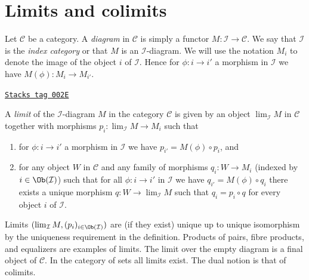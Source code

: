 \section{Limits and colimits}
\label{categories-section-limits}
Let $\mathcal{C}$ be a category. A {\it diagram} in $\mathcal{C}$ is
simply a functor $M : \mathcal{I} \to \mathcal{C}$. We say that
$\mathcal{I}$ is the {\it index category} or that $M$ is an
$\mathcal{I}$-diagram. We will use the notation $M_i$ to denote the
image of the object
$i$ of $\mathcal{I}$. Hence for $\phi : i \to i'$ a morphism
in $\mathcal{I}$ we have $M(\phi) : M_i \to M_{i'}$.

\begin{definition}[Limit]
\label{categories-definition-limit}
\href{https://stacks.math.columbia.edu/tag/002E}{\texttt{Stacks tag 002E}}

A {\it limit} of the $\mathcal{I}$-diagram $M$ in the category
$\mathcal{C}$ is given by an object $\lim_\mathcal{I} M$ in $\mathcal{C}$
together with morphisms $p_i : \lim_\mathcal{I} M \to M_i$ such that
\begin{enumerate}
\item for $\phi : i \to i'$ a morphism
in $\mathcal{I}$ we have $p_{i'} = M(\phi) \circ p_i$, and
\item for any object $W$ in $\mathcal{C}$ and any family of
morphisms $q_i : W \to M_i$ (indexed by $i \in \Ob(\mathcal{I})$)
such that for all $\phi : i \to i'$
in $\mathcal{I}$ we have $q_{i'} = M(\phi) \circ q_i$ there
exists a unique morphism $q : W \to \lim_\mathcal{I} M$ such that
$q_i = p_i \circ q$ for every object $i$ of $\mathcal{I}$.
\end{enumerate}
\end{definition}

Limits $(\lim_\mathcal{I} M, (p_i)_{i\in \Ob(\mathcal{I})})$ are
(if they exist)
unique up to unique isomorphism by the uniqueness requirement
in the definition. Products of pairs, fibre products, and equalizers are
examples of limits. The limit over the empty diagram is a final object
of $\mathcal{C}$.
In the category of sets all limits exist.
The dual notion is that of colimits.

